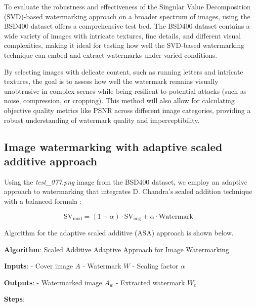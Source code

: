\documentclass[
  journal,
]{IEEEtran}%
\begin{document}
To evaluate the robustness and effectiveness of the Singular Value
Decomposition (SVD)-based watermarking approach on a broader spectrum of
images, using the BSD400 dataset offers a comprehensive test bed. The
BSD400 dataset contains a wide variety of images with intricate
textures, fine details, and different visual complexities, making it
ideal for testing how well the SVD-based watermarking technique can
embed and extract watermarks under varied conditions.

By selecting images with delicate content, such as running letters and
intricate textures, the goal is to assess how well the watermark remains
visually unobtrusive in complex scenes while being resilient to
potential attacks (such as noise, compression, or cropping). This method
will also allow for calculating objective quality metrics like PSNR
across different image categories, providing a robust understanding of
watermark quality and imperceptibility.

\subsection{Image watermarking with adaptive scaled additive
approach}\label{image-watermarking-with-adaptive-scaled-additive-approach}

Using the \emph{test\_077.png} image from the BSD400 dataset, we employ
an adaptive approach to watermarking that integrates D. Chandra's scaled
addition technique with a balanced formula
:

\begin{equation}
    \text{SV}_{\text{mod}} = (1 - \alpha) \cdot \text{SV}_{\text{img}} + \alpha \cdot \text{Watermark}
\end{equation}

Algorithm for the adaptive scaled additive (ASA) approach is shown
below.

\label{algo-ADAPTIVE}
\textbf{Algorithm}: Scaled Additive Adaptive Approach for Image
Watermarking

\textbf{Inputs}: - Cover image \(A\) - Watermark \(W\) - Scaling factor
\(\alpha\)

\textbf{Outputs}: - Watermarked image \(A_w\) - Extracted watermark
\(W_e\)

\textbf{Steps}:
\end{document}

